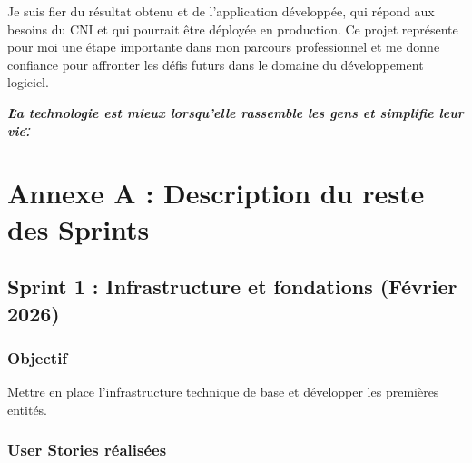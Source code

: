\documentclass[12pt,a4paper]{report}
\begin{document}
Je suis fier du résultat obtenu et de l'application développée, qui répond aux besoins du CNI et qui pourrait être déployée en production. Ce projet représente pour moi une étape importante dans mon parcours professionnel et me donne confiance pour affronter les défis futurs dans le domaine du développement logiciel.

\vspace{1cm}

\begin{center}
\textbf{\textit{\"La technologie est mieux lorsqu'elle rassemble les gens et simplifie leur vie.\"}}
\end{center}


\appendix
\chapter*{Annexe A : Description du reste des Sprints}

\section*{Sprint 1 : Infrastructure et fondations (Février 2026)}

\subsection*{Objectif}
Mettre en place l'infrastructure technique de base et développer les premières entités.

\subsection*{User Stories réalisées}
\end{document}
